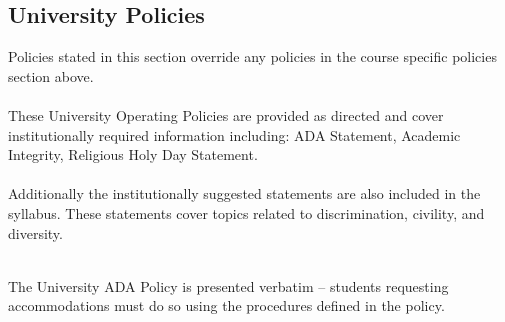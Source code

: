 \documentclass[12pt]{article}
\begin{document}
\begin{thebibliography}{}

\section*{University Policies}
Policies stated in this section override any policies in the course specific policies section above.
~\\~\\
These University Operating Policies are provided as directed and cover institutionally required information including: 
ADA Statement, Academic Integrity, Religious Holy Day Statement.
\\~\\
Additionally the institutionally suggested statements are also included in the syllabus.  
These statements cover topics related to discrimination, civility, and diversity.  

~\\The University ADA Policy is presented verbatim -- students requesting accommodations must do so using the procedures defined in the policy.

%
%

\end{thebibliography}
\end{document}

